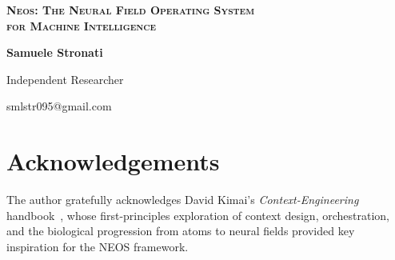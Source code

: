 \documentclass[10pt, letterpaper]{article}
\begin{document}
\thispagestyle{plain}

\begin{center}
  \vspace*{0.25cm}
  {\fontsize{17}{20}\selectfont\bfseries\textsc{Neos: The Neural Field Operating System\\ for Machine Intelligence}\par}
\end{center}

\vspace{0.8em}
\hspace{4.5em}%
\begin{minipage}{\dimexpr\textwidth-9em}
  \raggedright
  {\normalsize\bfseries Samuele Stronati\par}
  {\normalsize Independent Researcher\par}
  {\small smlstr095@gmail.com\par}
\end{minipage}





















\section*{Acknowledgements}

The author gratefully acknowledges David Kimai's
\emph{Context-Engineering} handbook~\cite{kimai2025context}, whose
first-principles exploration of context design, orchestration, and the
biological progression from atoms to neural fields provided key
inspiration for the NEOS framework.

\appendix




\end{document}
